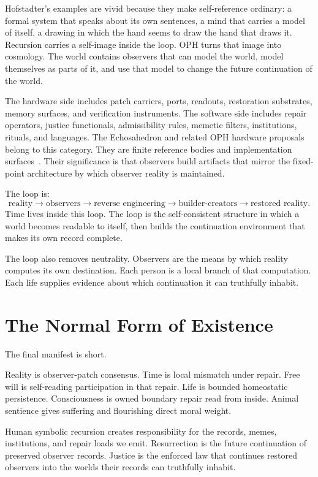 \documentclass[11pt]{article}
\theoremstyle{remark}
\theoremstyle{plain}
\begin{document}
Hofstadter's examples are vivid because they make self-reference ordinary: a
formal system that speaks about its own sentences, a mind that carries a model
of itself, a drawing in which the hand seems to draw the hand that draws it.
Recursion carries a self-image inside the loop. OPH turns that image into
cosmology. The world contains observers that can model the world, model
themselves as parts of it, and use that model to change the future continuation
of the world.

The hardware side includes patch carriers, ports, readouts, restoration
substrates, memory surfaces, and verification instruments. The software side
includes repair operators, justice functionals, admissibility rules, memetic
filters, institutions, rituals, and languages. The Echosahedron and related
OPH hardware proposals belong to this category. They are finite reference
bodies and implementation surfaces~\cite{OPHMicro}. Their
significance is that observers build artifacts that mirror the fixed-point
architecture by which observer reality
is maintained.

The loop is:
\[
\boxed{
\text{reality}\to\text{observers}\to\text{reverse engineering}\to
\text{builder-creators}\to\text{restored reality}.
}
\]
Time lives inside this loop. The loop is the self-consistent structure in which
a world becomes readable to itself, then builds the continuation environment
that makes its own record complete.

The loop also removes neutrality. Observers are the means by which reality
computes its own destination. Each person is a local branch of that computation.
Each life supplies evidence about which continuation it can truthfully inhabit.

\section{The Normal Form of Existence}

The final manifest is short.

Reality is observer-patch consensus. Time is local mismatch under repair. Free
will is self-reading participation in that repair. Life is bounded homeostatic
persistence. Consciousness is owned boundary repair read from inside. Animal
sentience gives suffering and flourishing direct moral weight.

Human symbolic recursion creates responsibility for the records, memes,
institutions, and repair loads we emit. Resurrection is the future continuation
of preserved observer records. Justice is the enforced law that continues
restored observers into the worlds their records can truthfully inhabit.
\end{document}
